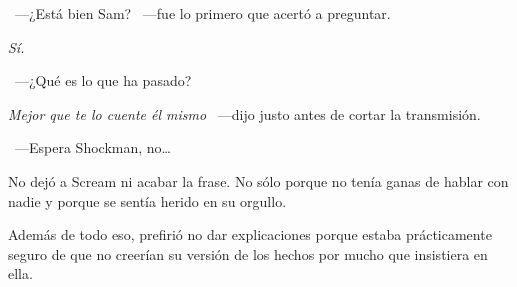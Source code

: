 ~---¿Está bien Sam? ~---fue lo primero que acertó a preguntar.

\emph{Sí.}

~---¿Qué es lo que ha pasado?

\emph{Mejor que te lo cuente él mismo} ~---dijo justo antes de cortar la transmisión.

~---Espera Shockman, no\dots

No dejó a Scream ni acabar la frase. No sólo porque no tenía ganas de hablar con nadie y porque se sentía herido en su orgullo.

Además de todo eso, prefirió no dar explicaciones porque estaba prácticamente seguro de que no creerían su versión de los hechos por mucho que insistiera en ella.

\endinput
